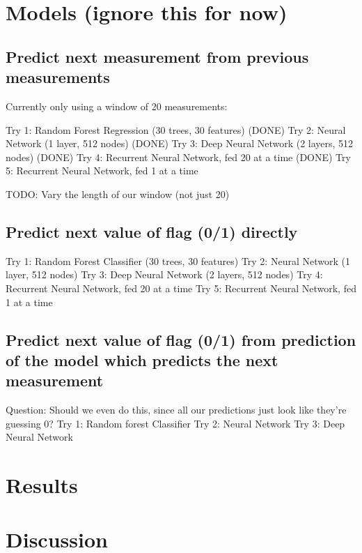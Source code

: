 \documentclass[12pt]{article}
\renewcommand{\=}[1]{\stackrel{#1}{=}} %
\theoremstyle{definition}
\begin{document}
\section{Models (ignore this for now)}
\subsection{Predict next measurement from previous measurements}
Currently only using a window of 20 measurements:

Try 1: Random Forest Regression (30 trees, 30 features) (DONE)
Try 2: Neural Network (1 layer, 512 nodes) (DONE)
Try 3: Deep Neural Network (2 layers, 512 nodes) (DONE)
Try 4: Recurrent Neural Network, fed 20 at a time (DONE)
Try 5: Recurrent Neural Network, fed 1 at a time

TODO: Vary the length of our window (not just 20)

\subsection{Predict next value of flag (0/1) directly}
Try 1: Random Forest Classifier (30 trees, 30 features)
Try 2: Neural Network (1 layer, 512 nodes) 
Try 3: Deep Neural Network (2 layers, 512 nodes) 
Try 4: Recurrent Neural Network, fed 20 at a time
Try 5: Recurrent Neural Network, fed 1 at a time

\subsection{Predict next value of flag (0/1) from prediction of the model which predicts the next measurement}
Question: Should we even do this, since all our predictions just look like they're guessing 0?
Try 1: Random forest Classifier 
Try 2: Neural Network
Try 3: Deep Neural Network



\section{Results}

\section{Discussion}


 
\end{document}
